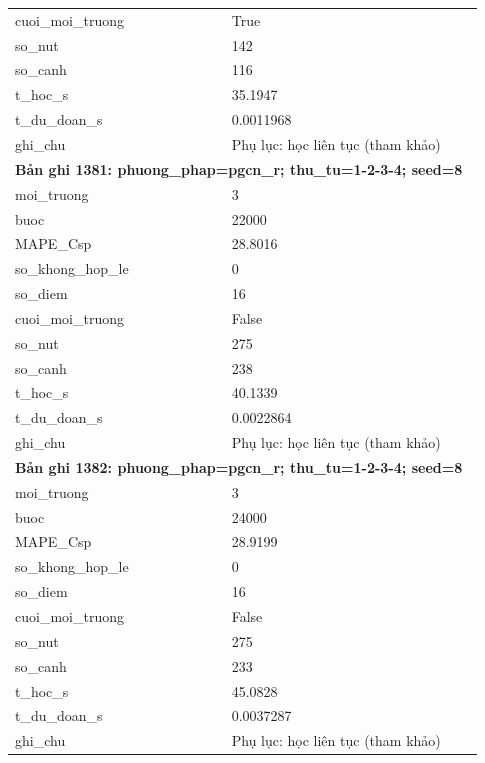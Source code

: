 \begin{longtable}{p{0.43\linewidth}p{0.50\linewidth}}
cuoi\_\allowbreak moi\_\allowbreak truong & True \\
so\_\allowbreak nut & 142 \\
so\_\allowbreak canh & 116 \\
t\_\allowbreak hoc\_\allowbreak s & 35.1947 \\
t\_\allowbreak du\_\allowbreak doan\_\allowbreak s & 0.0011968 \\
ghi\_\allowbreak chu & Phụ lục: học liên tục (tham khảo) \\
\midrule
\multicolumn{2}{p{0.95\linewidth}}{\textbf{Bản ghi 1381: phuong\_phap=pgcn\_r; thu\_tu=1-2-3-4; seed=8}} \\
moi\_\allowbreak truong & 3 \\
buoc & 22000 \\
MAPE\_\allowbreak Csp & 28.8016 \\
so\_\allowbreak khong\_\allowbreak hop\_\allowbreak le & 0 \\
so\_\allowbreak diem & 16 \\
cuoi\_\allowbreak moi\_\allowbreak truong & False \\
so\_\allowbreak nut & 275 \\
so\_\allowbreak canh & 238 \\
t\_\allowbreak hoc\_\allowbreak s & 40.1339 \\
t\_\allowbreak du\_\allowbreak doan\_\allowbreak s & 0.0022864 \\
ghi\_\allowbreak chu & Phụ lục: học liên tục (tham khảo) \\
\midrule
\multicolumn{2}{p{0.95\linewidth}}{\textbf{Bản ghi 1382: phuong\_phap=pgcn\_r; thu\_tu=1-2-3-4; seed=8}} \\
moi\_\allowbreak truong & 3 \\
buoc & 24000 \\
MAPE\_\allowbreak Csp & 28.9199 \\
so\_\allowbreak khong\_\allowbreak hop\_\allowbreak le & 0 \\
so\_\allowbreak diem & 16 \\
cuoi\_\allowbreak moi\_\allowbreak truong & False \\
so\_\allowbreak nut & 275 \\
so\_\allowbreak canh & 233 \\
t\_\allowbreak hoc\_\allowbreak s & 45.0828 \\
t\_\allowbreak du\_\allowbreak doan\_\allowbreak s & 0.0037287 \\
ghi\_\allowbreak chu & Phụ lục: học liên tục (tham khảo) \\

\end{longtable}
